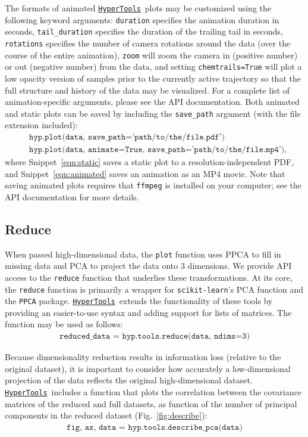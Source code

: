 \documentclass[12pt,letterpaper]{article}
\newcommand{\hypertools}{\href{https://github.com/ContextLab/hypertools}{\texttt{HyperTools}}}
\begin{document}
The formats of animated \hypertools~plots may be customized using the following keyword arguments: \texttt{duration} specifies the animation duration in seconds, \texttt{tail\_duration} specifies the duration of the trailing tail in seconds, \texttt{rotations} specifies the number of camera rotations around the data (over the course of the entire animation), \texttt{zoom} will zoom the camera in (positive number) or out (negative number) from the data, and setting \texttt{chemtrails=True} will plot a low opacity version of samples prior to the currently active trajectory so that the full structure and history of the data may be visualized.   For a complete list of animation-specific arguments, please see the API documentation.  Both animated and static plots can be saved by including the \texttt{save\_path} argument (with the file extension included):
\begin{align}
& \texttt{hyp.plot(data, save\_path='path/to/the/file.pdf')}\label{eqn:static}\\
& \texttt{hyp.plot(data, animate=True, save\_path='path/to/the/file.mp4')}\label{eqn:animated},
\end{align}
where Snippet~\ref{eqn:static} saves a static plot to a resolution-independent PDF, and Snippet~\ref{eqn:animated} saves an animation as an MP4 movie.  Note that saving animated plots requires that \texttt{ffmpeg} is installed on your computer; see the  API documentation for more details.




\subsection*{Reduce}
When passed high-dimensional data, the \texttt{plot} function uses PPCA to fill in missing data and PCA to project the data onto 3 dimensions.  We provide API access to the \texttt{reduce} function that underlies these transformations.  At its core, the \texttt{reduce} function is primarily a wrapper for \texttt{scikit-learn}'s PCA function and the \texttt{PPCA} package.  \hypertools~extends the functionality of these tools by providing an easier-to-use syntax and adding support for lists of matrices.  The function may be used as follows:
\begin{align}
\texttt{reduced\_data = hyp.tools.reduce(data, ndims=3)}
\end{align}

Because dimensionality reduction results in information loss (relative to the original dataset), it is important to consider how accurately a low-dimensional projection of the data reflects the original high-dimensional dataset.  \hypertools~includes a function that plots the correlation between the covariance matrices of the reduced and full datasets, as function of the number of principal components in the reduced dataset (Fig.~\ref{fig:describe}):
\begin{align}
\texttt{fig, ax, data = hyp.tools.describe\_pca(data)}
\end{align}
\end{document}
